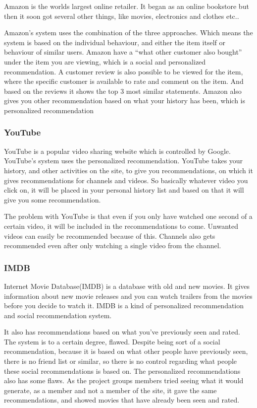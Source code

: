 Amazon is the worlds largest online retailer. It began as an online bookstore but then it soon got several other things, like movies, electronics and clothes etc..

Amazon's system uses the combination of the three approaches. Which means the system is based on the individual behaviour, and either the item itself or behaviour of similar users. Amazon have a “what other customer also bought” under the item you are viewing, which is a social and personalized recommendation. A customer review is also possible to be viewed for the item, where the specific customer is available to rate and comment on the item. And based on the reviews it shows the top 3 most similar statements. Amazon also gives you other recommendation based on what your history has been, which is personalized recommendation

\subsubsection{YouTube}

YouTube is a popular video sharing website which is controlled by Google. YouTube's system uses the personalized recommendation. YouTube takes your history, and other activities on the site, to give you recommendations, on which it gives recommendations for channels and videos. So basically whatever video you click on, it will be placed in your personal history list and based on that it will give you some recommendation.

The problem with YouTube is that even if you only have watched one second of a certain video, it will be included in the recommendations to come. Unwanted videos can easily be recommended because of this. Channels also gets recommended even after only watching a single video from the channel.

\subsubsection{IMDB}

Internet Movie Database(IMDB) is a database with old and new movies. It gives information about new movie releases and you can watch trailers from the movies before you decide to watch it. IMDB is a kind of  personalized recommendation and social recommendation system. 

It also has recommendations based on what you’ve previously seen and rated. The system is to a certain degree, flawed. Despite being sort of a social recommendation, because it is based on what other people have previously seen, there is no friend list or similar, so there is no control regarding what people these social recommendations is based on. The personalized recommendations also has some flaws. As the project groups members tried seeing what it would generate, as a member and not a member of the site, it gave the same recommendations, and showed movies that have already been seen and rated.

